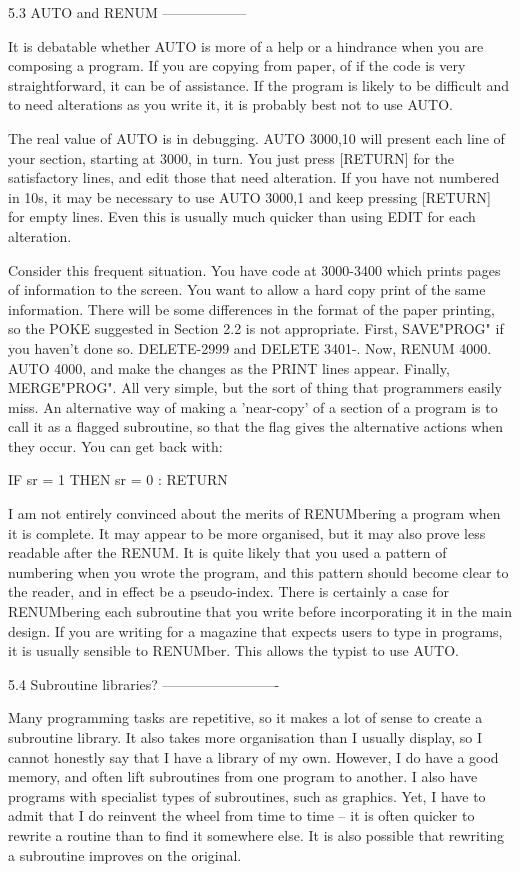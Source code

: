 5.3 AUTO and RENUM
------------------

It  is  debatable whether AUTO is more of a help or a hindrance when  you  are 
composing  a  program. If you are copying from paper, of if the code  is  very 
straightforward,  it  can  be of assistance. If the program is  likely  to  be 
difficult and to need alterations as you write it, it is probably best not  to 
use AUTO.

The real value of AUTO is in debugging. AUTO 3000,10 will present each line of 
your  section,  starting  at 3000, in turn. You just press  [RETURN]  for  the 
satisfactory  lines,  and  edit those that need alteration. If  you  have  not 
numbered  in  10s, it may be necessary to use AUTO 3000,1  and  keep  pressing 
[RETURN]  for empty lines. Even this is usually much quicker than  using  EDIT 
for each alteration.

Consider  this  frequent situation. You have code at  3000-3400  which  prints 
pages of information to the screen. You want to allow a hard copy print of the 
same  information. There will be some differences in the format of  the  paper 
printing,  so  the POKE suggested in Section 2.2 is  not  appropriate.  First, 
SAVE"PROG"  if you haven't done so. DELETE-2999 and DELETE 3401-.  Now,  RENUM 
4000.  AUTO  4000, and make the changes as the PRINT  lines  appear.  Finally, 
MERGE"PROG".  All very simple, but the sort of thing that  programmers  easily 
miss. An alternative way of making a 'near-copy' of a section of a program  is 
to  call  it as a flagged subroutine, so that the flag gives  the  alternative 
actions when they occur. You can get back with:

        IF sr = 1 THEN sr = 0 : RETURN

I am not entirely convinced about the merits of RENUMbering a program when  it 
is  complete. It may appear to be more organised, but it may also  prove  less 
readable  after  the  RENUM. It is quite likely that you  used  a  pattern  of 
numbering when you wrote the program, and this pattern should become clear  to 
the  reader,  and in effect be a pseudo-index. There is certainly a  case  for 
RENUMbering each subroutine that you write before incorporating it in the main 
design.  If  you  are writing for a magazine that expects  users  to  type  in 
programs,  it is usually sensible to RENUMber. This allows the typist  to  use 
AUTO.


5.4 Subroutine libraries?
-------------------------

Many programming tasks are repetitive, so it makes a lot of sense to create  a 
subroutine library. It also takes more organisation than I usually display, so 
I  cannot honestly say that I have a library of my own. However, I do  have  a 
good  memory, and often lift subroutines from one program to another.  I  also 
have  programs with specialist types of subroutines, such as graphics. Yet,  I 
have  to admit that I do reinvent the wheel from time to time -- it  is  often 
quicker  to  rewrite  a routine than to find it somewhere  else.  It  is  also 
possible that rewriting a subroutine improves on the original.

